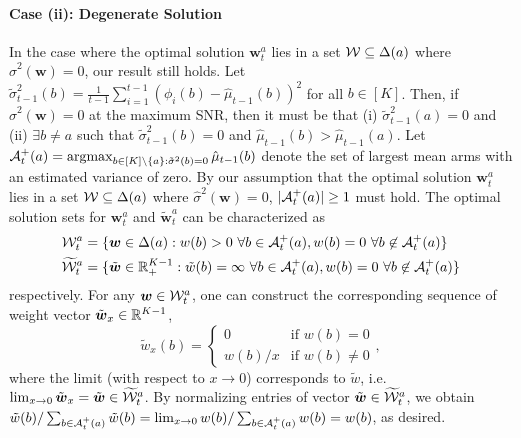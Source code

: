 \documentclass{article}
\begin{document}
\begin{appendices}
\paragraph{Case (ii): Degenerate Solution} In the case where the optimal solution $\bm{w}_t^a$ lies in a set $\mathcal{W} \subseteq \Delta(a)$ where $\hat\sigma^2(\bm{w}) = 0$, our result still holds. Let $\tilde\sigma_{t-1}^2(b) = \frac{1}{t-1}\sum_{i=1}^{t-1} \left(\phi_i(b) - \hat\mu_{t-1}(b)\right)^2$ for all $b \in [K]$. Then, if $\hat\sigma^2(\bm{w}) = 0$ at the maximum SNR, then it must be that (i) $\tilde\sigma_{t-1}^2(a)= 0$ and (ii) $\exists b \neq a$ such that $\tilde\sigma_{t-1}^2(b) = 0$ and $\hat\mu_{t-1}(b) > \hat\mu_{t-1}(a)$. Let $\Acal_t^+(a) = \argmax_{b \in [K]\setminus\{a\}: \tilde\sigma^2(b) = 0} \hat\mu_{t-1}(b)$ denote the set of largest mean arms with an estimated variance of zero. By our assumption that the optimal solution $\bm{w}_t^a$ lies in a set $\mathcal{W} \subseteq \Delta(a)$ where $\hat\sigma^2(\bm{w}) = 0$, $|\mathcal{A}_t^+(a)| \geq 1$ must hold. The optimal solution sets for $\bm{w}_t^a$ and $\tilde{\bm{w}}_t^a$ can be characterized as 
\begin{align}
    \mathcal{W}_t^a &= \{\boldsymbol{w} \in \Delta(a): w(b) > 0 \ \forall b \in \mathcal{A}_t^+(a), w(b) = 0  \ \forall b \not\in  \mathcal{A}_t^+(a)\}\\
    \widetilde{\mathcal{W}}_t^a &= \{\tilde{\boldsymbol{w}} \in \mathbb{R}_+^{K-1}: \tilde{w}(b) = \infty \ \forall b \in \mathcal{A}_t^+(a), w(b) = 0  \ \forall b \not\in  \mathcal{A}_t^+(a)\}
\end{align}
respectively. For any $\boldsymbol{w} \in \mathcal{W}_t^a$, one can construct the corresponding sequence of weight vector $\tilde{\boldsymbol{w}}_x \in \mathbb{R}^{K-1}$, 
\begin{equation}
    \tilde{w}_x(b) = \begin{cases} 0 & \text{if }w(b) = 0 \\  w(b)/x & \text{if }w(b) \neq 0\end{cases},
\end{equation}
where the limit (with respect to $x \rightarrow 0$) corresponds to $\tilde{w}$, i.e. $\lim_{x \rightarrow 0}\tilde{\boldsymbol{w}}_x = \tilde{\boldsymbol{w}} \in \widetilde{\mathcal{W}}_t^a$. By normalizing entries of vector $\tilde{\boldsymbol{w}} \in \widetilde{\mathcal{W}}_t^a$, we obtain $\tilde{w}(b)/\sum_{b \in \mathcal{A}_t^+(a)} \tilde{w}(b) = \lim_{x \rightarrow 0} w(b)/\sum_{b \in \mathcal{A}_t^+(a)} w(b) = w(b)$, as desired. 


\end{appendices}
\end{document}
